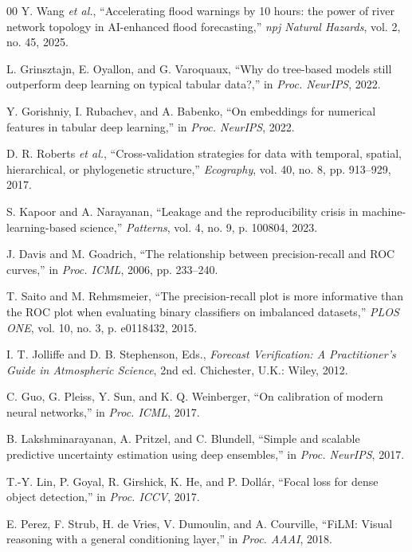 \documentclass[conference]{IEEEtran}
\begin{document}
\begin{thebibliography}{00}
 Y. Wang \emph{et al.}, ``Accelerating flood warnings by 10
hours: the power of river network topology in AI-enhanced flood forecasting,''
\emph{npj Natural Hazards}, vol. 2, no. 45, 2025.

 L. Grinsztajn, E. Oyallon, and G. Varoquaux, ``Why do
tree-based models still outperform deep learning on typical tabular data?,'' in
\emph{Proc. NeurIPS}, 2022.

 Y. Gorishniy, I. Rubachev, and A. Babenko, ``On
embeddings for numerical features in tabular deep learning,'' in \emph{Proc.
NeurIPS}, 2022.

 D. R. Roberts \emph{et al.}, ``Cross-validation strategies
for data with temporal, spatial, hierarchical, or phylogenetic structure,''
\emph{Ecography}, vol. 40, no. 8, pp. 913--929, 2017.

 S. Kapoor and A. Narayanan, ``Leakage and the
reproducibility crisis in machine-learning-based science,'' \emph{Patterns},
vol. 4, no. 9, p. 100804, 2023.

 J. Davis and M. Goadrich, ``The relationship between
precision-recall and ROC curves,'' in \emph{Proc. ICML}, 2006, pp. 233--240.

 T. Saito and M. Rehmsmeier, ``The precision-recall plot is
more informative than the ROC plot when evaluating binary classifiers on
imbalanced datasets,'' \emph{PLOS ONE}, vol. 10, no. 3, p. e0118432, 2015.

 I. T. Jolliffe and D. B. Stephenson, Eds., \emph{Forecast
Verification: A Practitioner's Guide in Atmospheric Science}, 2nd ed. Chichester,
U.K.: Wiley, 2012.

 C. Guo, G. Pleiss, Y. Sun, and K. Q. Weinberger, ``On
calibration of modern neural networks,'' in \emph{Proc. ICML}, 2017.

 B. Lakshminarayanan, A. Pritzel, and C. Blundell,
``Simple and scalable predictive uncertainty estimation using deep ensembles,''
in \emph{Proc. NeurIPS}, 2017.

 T.-Y. Lin, P. Goyal, R. Girshick, K. He, and P. Doll\'{a}r,
``Focal loss for dense object detection,'' in \emph{Proc. ICCV}, 2017.

 E. Perez, F. Strub, H. de Vries, V. Dumoulin, and
A. Courville, ``FiLM: Visual reasoning with a general conditioning layer,'' in
\emph{Proc. AAAI}, 2018.


\end{thebibliography}
\end{document}
